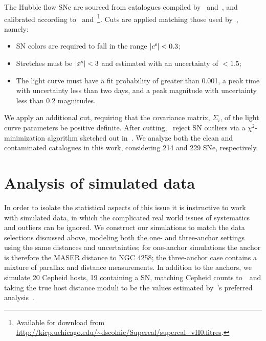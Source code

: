 \documentclass[a4paper,fleqn,usenatbib]{mnras}
\newcommand{\riess}{\citetalias{Riess_etal:2016}}
\newcommand{\xsalt}{\ensuremath{x^{\rm s}}}
\newcommand{\csalt}{\ensuremath{c^{\rm s}}}
\begin{document}
{The Hubble flow SNe are sourced from catalogues compiled by~\citet{Riess_etal:1999,Jha_etal:2006,Hicken_etal:2009a,Hicken_etal:2012,Guy_etal:2010,Stritzinger_etal:2011,Rest_etal:2014} and~\cite{Sako_etal:2014}, and 
calibrated according to~\cite{Scolnic_etal:2015} and~\cite{Scolnic_Kessler:2016}\footnote{Available for download from \url{http://kicp.uchicago.edu/~dscolnic/Supercal/supercal_vH0.fitres}.}. Cuts are applied matching those used by~\riess, namely: 
\begin{itemize}
\item
SN colors are required to fall in the range $|\csalt| < 0.3$; 
\item
Stretches must be $|\xsalt| < 3$ and estimated with an uncertainty of $< 1.5$;
\item
The light curve must have a fit probability of greater than 0.001, 
a peak time with uncertainty less than two days, 
and a peak magnitude with uncertainty less than 0.2 magnitudes.
\end{itemize}
We apply an additional cut, requiring that the covariance matrix, $\Sigma_i$, of the light curve parameters be positive definite. After cutting, \riess\ reject SN outliers via a $\chi^2$-minimization algorithm sketched out in~\cite{Marriner_etal:2011}. We analyze both the clean and contaminated catalogues in this work, considering 214 and 229 SNe, respectively.


\section{Analysis of simulated data}
\label{section:sim}

In order to isolate the statistical aspects of this issue it is instructive to work with simulated data, in which the complicated real world issues of systematics and outliers can be ignored. We construct our simulations to match the data selections discussed above, modeling both the one- and three-anchor settings using the same distances and uncertainties; for one-anchor simulations the anchor is therefore the MASER distance to NGC 4258; the three-anchor case contains a mixture of parallax and distance measurements. In addition to the anchors, we simulate 20 Cepheid hosts, 19 containing a SN, matching Cepheid counts to~\riess\ and taking the true host distance moduli to be the values estimated by~\riess's preferred analysis~\citep[see][Table 5]{Riess_etal:2016}.

}
\end{document}
